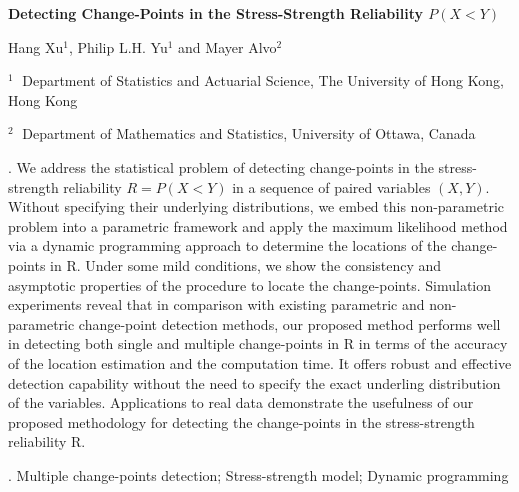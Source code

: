 \documentclass[12pt]{article}
\begin{document}
\begin{flushleft}


{\LARGE\bf Detecting Change-Points in the Stress-Strength Reliability $P(X<Y)$}


\vspace{1.0cm}

Hang Xu$^1$, Philip L.H. Yu$^1$ and Mayer Alvo$^2$

\begin{description}

\item $^1 \;$ Department of Statistics and Actuarial Science, The University of Hong Kong, Hong Kong 

\item $^2 \;$ Department of Mathematics and Statistics, University of Ottawa, Canada
\end{description}

\end{flushleft}


\vspace{0.75cm}

. We address the statistical problem of detecting change-points in the stress-strength reliability $R=P(X<Y)$ in a sequence of paired variables $(X,Y)$. Without specifying their underlying distributions, we embed this non-parametric problem into a parametric framework and apply the maximum likelihood method via a dynamic programming approach to determine the locations of the change-points in R. Under some mild conditions, we show the consistency and asymptotic properties of the procedure to locate the change-points. Simulation experiments reveal that in comparison with existing parametric and non-parametric change-point detection methods, our proposed method performs well in detecting both single and multiple change-points in R in terms of the accuracy of the location estimation and the computation time. It offers robust and effective detection capability without the need to specify the exact underling distribution of the variables. Applications to real data demonstrate the usefulness of our proposed methodology for detecting the change-points in the stress-strength reliability R. 

\vskip 2mm

.
 Multiple change-points detection; Stress-strength model; Dynamic programming
\end{document}
